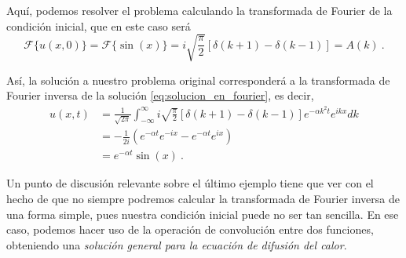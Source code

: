 \begin{ejemplo}
    Aquí, podemos resolver el problema calculando la transformada de Fourier de la condición inicial, que en este caso será
    \begin{equation}
        \mathcal{F}\{u(x,0)\} =  \mathcal{F}\{\sin(x)\} = i \sqrt{\frac{\pi}{2}} [\delta(k+1) - \delta(k-1)] = A(k) \ .
    \end{equation}
    
    Así, la solución a nuestro problema original corresponderá a la transformada de Fourier inversa de la solución \eqref{eq:solucion_en_fourier}, es decir,
    \begin{align}
        u(x,t) & = \frac{1}{\sqrt{2\pi}} \int_{-\infty}^\infty i \sqrt{\frac{\pi}{2}} [\delta(k+1) - \delta(k-1)] e^{-\alpha k^2 t} e^{ikx} dk \nonumber \\
        & = - \frac{1}{2i} \left( e^{-\alpha t} e^{-ix} - e^{-\alpha t} e^{ix} \right) \nonumber \\
        & = e^{-\alpha t} \sin(x) \ . \label{eq:solucion_edp_fourier_final}
    \end{align}
\end{ejemplo}

Un punto de discusión relevante sobre el último ejemplo tiene que ver con el hecho de que no siempre podremos calcular la transformada de Fourier inversa de una forma simple, pues nuestra condición inicial puede no ser tan sencilla. En ese caso, podemos hacer uso de la operación de convolución entre dos funciones, obteniendo una \emph{solución general para la ecuación de difusión del calor}.

